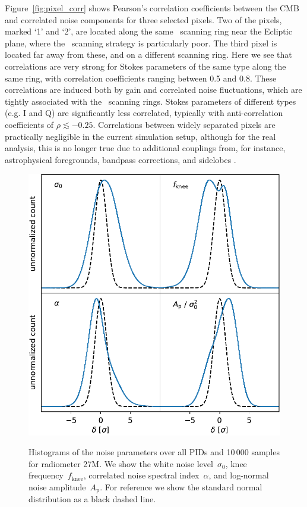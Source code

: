 \documentclass[twocolumn]{aa}%
\begin{document}
Figure~\ref{fig:pixel_corr} shows Pearson's correlation coefficients
between the CMB and correlated noise components for three selected
pixels. Two of the pixels, marked `1' and `2', are located along the
same \Planck\ scanning ring near the Ecliptic plane, where the
\Planck\ scanning strategy is particularly poor. The third pixel is
located far away from these, and on a different scanning ring. Here we
see that correlations are very strong for Stokes parameters of the
same type along the same ring, with correlation coefficients ranging
between 0.5 and 0.8. These correlations are induced both by gain and
correlated noise fluctuations, which are tightly associated with the
\Planck\ scanning rings. Stokes parameters of different types (e.g. I and Q) are significantly less correlated, typically with anti-correlation
coefficients of $\rho\lesssim-0.25$. Correlations between widely
separated pixels are practically negligible in the current simulation
setup, although for the real analysis, this is no longer true due to
additional couplings from, for instance, astrophysical foregrounds,
bandpass corrections, and sidelobes \citep{bp08,bp09,bp10,bp11,bp13,bp14}.


\begin{figure}[t]
    \includegraphics[width=\linewidth]{figs/xi_n_histograms_allPIDs_chain10000_det27M.pdf}\\
    \caption{Histograms of the noise parameters over all PIDs and 10\,000 samples for radiometer 27M. We show the white noise level~$\sigma_0$, knee
      frequency~$f_\mathrm{knee}$, correlated noise spectral
      index~$\alpha$, and log-normal noise
      amplitude~$A_\mathrm{p}$. For reference we show the standard normal distribution as a black dashed line.}
    \label{fig:xi_n}
\end{figure}
\end{document}
